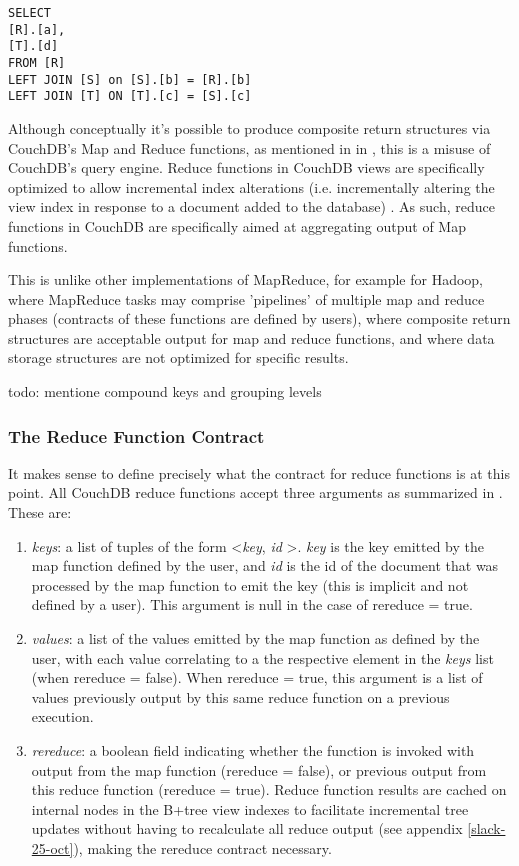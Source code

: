 \begin{verbatim}
SELECT
[R].[a],
[T].[d]
FROM [R]
LEFT JOIN [S] on [S].[b] = [R].[b]
LEFT JOIN [T] ON [T].[c] = [S].[c]
\end{verbatim}

Although conceptually it's possible to produce composite return structures via CouchDB's Map and Reduce functions, as mentioned in in \cite{reduceFunctions}, this is a misuse of CouchDB's query engine. Reduce functions in CouchDB views are specifically optimized to allow incremental index alterations (i.e. incrementally altering the view index in response to a document added to the database) \cite{reduceFunctions}. As such, reduce functions in CouchDB are specifically aimed at aggregating output of Map functions.

This is unlike other implementations of MapReduce, for example for Hadoop, where MapReduce tasks may comprise 'pipelines' of multiple map and reduce phases (contracts of these functions are defined by users), where composite return structures are acceptable output for map and reduce functions, and where data storage structures are not optimized for specific results.

todo: mentione compound keys and grouping levels

\subsubsection{The Reduce Function Contract}
It makes sense to define precisely what the contract for reduce functions is at this point. All CouchDB reduce functions accept three arguments as summarized in \cite{reduceFunctions}. These are:

\begin{enumerate}
    \item \textit{keys}: a list of tuples of the form \textless \textit{key}, \textit{id} \textgreater. \textit{key} is the key emitted by the map function defined by the user, and \textit{id} is the id of the document that was processed by the map function to emit the key (this is implicit and not defined by a user). This argument is null in the case of rereduce = true.
    \item \textit{values}: a list of the values emitted by the map function as defined by the user, with each value correlating to a the respective element in the \textit{keys} list (when rereduce = false). When rereduce = true, this argument is a list of values previously output by this same reduce function on a previous execution.
    \item \textit{rereduce}: a boolean field indicating whether the function is invoked with output from the map function (rereduce = false), or previous output from this reduce function (rereduce = true). Reduce function results are cached on internal nodes in the B+tree view indexes to facilitate incremental tree updates without having to recalculate all reduce output (see appendix \ref{slack-25-oct}), making the rereduce contract necessary.
\end{enumerate}

